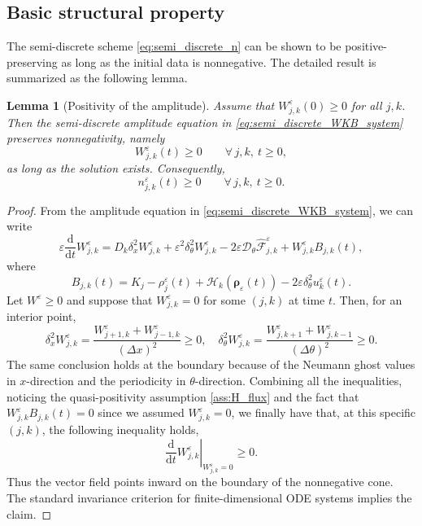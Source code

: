 \documentclass[11pt]{article}
\newtheorem{lemma}{Lemma}[section]
\begin{document}
\subsection{Basic structural property}

The semi-discrete scheme \eqref{eq:semi_discrete_n} can be shown to be positive-preserving 
as long as the initial data is nonnegative. 
The detailed result is summarized as the following lemma. 

\begin{lemma}[Positivity of the amplitude]
\label{lem:positivity_W}
Assume that \(W_{j,k}^\varepsilon(0)\ge0\) for all \(j,k\). Then the
semi-discrete amplitude equation in \eqref{eq:semi_discrete_WKB_system}
preserves nonnegativity, namely
\[
    W_{j,k}^\varepsilon(t)\ge0
    \qquad
    \forall\,j,k,\ t\ge0,
\]
as long as the solution exists. Consequently,
\[
    n_{j,k}^\varepsilon(t)\ge0
    \qquad
    \forall\,j,k,\ t\ge0 .
\]
\end{lemma}

\begin{proof}
From the amplitude
equation in \eqref{eq:semi_discrete_WKB_system}, we can write
\[
\varepsilon \frac{\mathrm d}{\mathrm dt}W_{j,k}^\varepsilon
=
D_k\delta_x^2W_{j,k}^\varepsilon
+
\varepsilon^2\delta_\theta^2W_{j,k}^\varepsilon
-
2\varepsilon
\mathcal D_\theta\widehat{\mathcal F}^\varepsilon_{j,k}
+
W_{j,k}^\varepsilon B_{j,k}(t),
\]
where
\[
B_{j,k}(t)
=
K_j-\rho_{j}^\varepsilon(t)
+\mathcal H_k(\boldsymbol\rho_\varepsilon(t))
-2\varepsilon\delta_\theta^2u_k^\varepsilon(t).
\]
Let \(W^\varepsilon\ge0\) and suppose that
\(W_{j,k}^\varepsilon=0\) for some \((j,k)\) at time $t$. Then, for an interior point,
\[
\delta_x^2W_{j,k}^\varepsilon
=
\frac{W_{j+1,k}^\varepsilon+W_{j-1,k}^\varepsilon}{(\Delta x)^2}
\ge0, 
\quad 
\delta_\theta^2W_{j,k}^\varepsilon
=
\frac{W_{j,k+1}^\varepsilon+W_{j,k-1}^\varepsilon}{(\Delta\theta)^2}
\ge0 .
\]
The same conclusion holds at the boundary because of the Neumann ghost
values in $x$-direction and the periodicity in \(\theta\)-direction. 
Combining all the inequalities, noticing the quasi-positivity assumption \eqref{ass:H_flux} and the fact that 
\(
    W_{j,k}^\varepsilon B_{j,k}(t)=0 
\)
since we assumed $W_{j,k}^\varepsilon=0$, 
we finally have that, at this specific $(j,k)$, the following inequality holds, 
\[
\left.
\frac{\mathrm d}{\mathrm dt}W_{j,k}^\varepsilon
\right|_{W_{j,k}^\varepsilon=0}
\ge0 .
\]
Thus the vector field points inward on the boundary of the nonnegative cone.
The standard invariance criterion for finite-dimensional ODE systems implies
the claim.
\end{proof}
\end{document}
